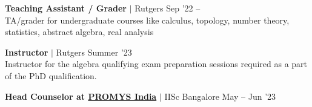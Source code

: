 \resumeProjectHeading
{\textbf{Teaching Assistant / Grader} $|$ Rutgers}
{Sep '22 -- }\\
\vspace{4pt}
{\color{gray}TA/grader for undergraduate courses like calculus, topology, number theory, statistics, abstract algebra, real analysis}
\vspace{-13pt}

\resumeProjectHeading
{\textbf{Instructor} $|$ Rutgers}
{Summer '23}\\
\vspace{4pt}
{\color{gray}Instructor for the algebra qualifying exam preparation sessions required as a part of the PhD qualification.}
\vspace{-13pt}

\resumeProjectHeading
{\textbf{Head Counselor at \href{https://promys-india.org}{PROMYS India}} $|$ IISc Bangalore}
{May -- Jun '23}
\vspace{\mygap}

